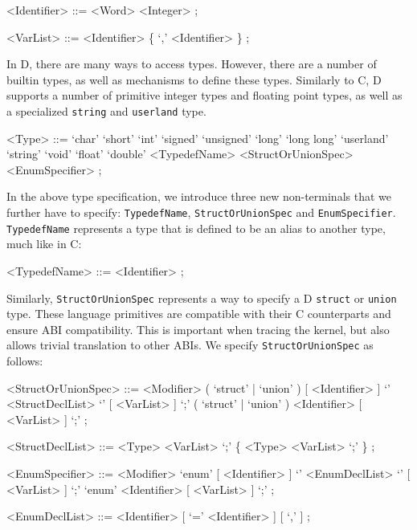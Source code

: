 \begin{grammar}
<Identifier> ::= <Word> <Integer> ;

<VarList> ::= <Identifier> \{ `,' <Identifier> \} ;
\end{grammar}

\noindent
In D, there are many ways to access types. However, there are a number of
builtin types, as well as mechanisms to define these types. Similarly to C, D
supports a number of primitive integer types and floating point types, as well
as a specialized \texttt{string} and \texttt{userland} type.

\begin{grammar}
<Type> ::= `char'
	\alt `short'
	\alt `int'
	\alt `signed'
	\alt `unsigned'
	\alt `long'
	\alt `long long'
	\alt `userland'
	\alt `string'
	\alt `void'
	\alt `float'
	\alt `double'
	\alt <TypedefName>
	\alt <StructOrUnionSpec>
	\alt <EnumSpecifier> ;
\end{grammar}

\noindent
In the above type specification, we introduce three new non-terminals that we
further have to specify: \texttt{TypedefName}, \texttt{StructOrUnionSpec} and
\texttt{EnumSpecifier}.  \texttt{TypedefName} represents a type that is defined
to be an alias to another type, much like in C:

\begin{grammar}
<TypedefName> ::= <Identifier> ;
\end{grammar}

\noindent
Similarly, \texttt{StructOrUnionSpec} represents a way to specify a D
\texttt{struct} or \texttt{union} type. These language primitives are compatible
with their C counterparts and ensure ABI compatibility. This is important when
tracing the kernel, but also allows trivial translation to other ABIs.  We
specify \texttt{StructOrUnionSpec} as follows:

\begin{grammar}
<StructOrUnionSpec> ::= <Modifier> ( `struct' | `union' ) [ <Identifier> ] \newline
	`{' <StructDeclList> `}' [ <VarList> ] `;'
	\alt ( `struct' | `union' ) <Identifier> [ <VarList> ] `;' ;

<StructDeclList> ::= <Type> <VarList> `;' \{ <Type> <VarList> `;' \} ;

<EnumSpecifier> ::= <Modifier> `enum' [ <Identifier> ] \newline
	`{' <EnumDeclList> `}' [ <VarList> ] `;'
	\alt `enum' <Identifier> [ <VarList> ] `;' ;

<EnumDeclList> ::= <Identifier> [ `=' <Identifier> ] [ `,' ] ;
\end{grammar}

